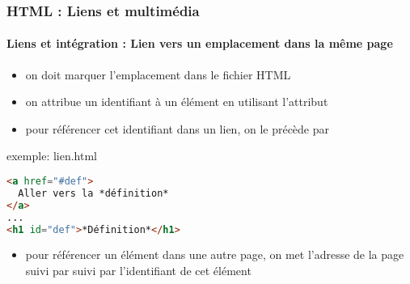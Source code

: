 \documentclass[xcolor=table]{beamer}
\begin{document}
\begin{frame}[fragile]
\frametitle{HTML : Liens et multimédia}
\framesubtitle{Liens et intégration : Lien vers un emplacement dans la même page}

\begin{minipage}{0.50\textwidth} 
	\begin{itemize}
		\item on doit marquer l'emplacement dans le fichier HTML
		\item on attribue un identifiant à un élément en utilisant l'attribut 
		\item pour référencer cet identifiant dans un lien, on le précède par \keyword{\#}
	\end{itemize}
\end{minipage}
%
\begin{minipage}{0.49\textwidth}
\begin{exampleblock}{exemple: lien.html}
\lstset{escapeinside=**}
\scriptsize\bfseries\vspace{-6pt}
\begin{lstlisting}[language={html}]
<a href="#def">
  Aller vers la *définition*
</a> 
...
<h1 id="def">*Définition*</h1>
\end{lstlisting}\vspace{-6pt}
\end{exampleblock}
\end{minipage}

\begin{itemize}
	\item pour référencer un élément dans une autre page, on met l'adresse de la page suivi par \keyword{\#} suivi par l'identifiant de cet élément
\end{itemize}

\end{frame}
\end{document}
